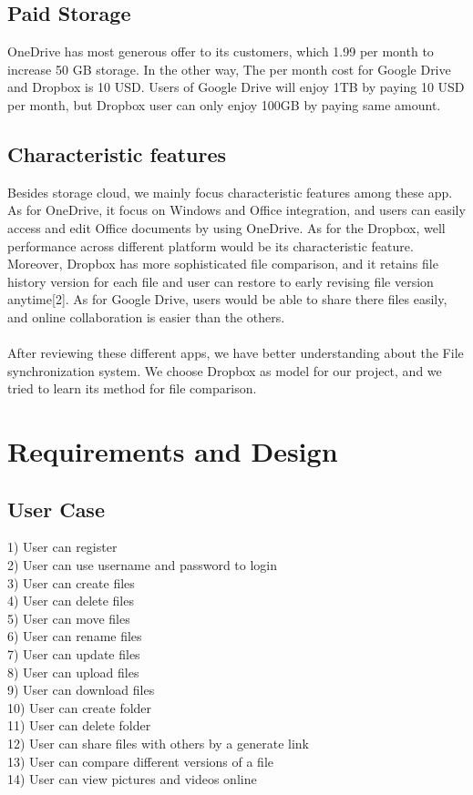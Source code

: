 \documentclass[12pt,a4]{article}
\begin{document}
\subsection{Paid Storage}\label{SubSec-Value}	
OneDrive has most generous offer to its customers, which 1.99 per month to increase 50 GB storage. In the other way, The per month cost for  Google Drive and Dropbox is 10 USD. Users of Google Drive will enjoy 1TB by paying 10 USD per month, but Dropbox user can only enjoy 100GB by paying same amount.

\subsection{Characteristic features}\label{SubSec-Value}	
Besides storage cloud, we mainly focus characteristic features among these app. As for OneDrive, it focus on Windows and Office integration, and users can easily access and edit Office documents by using OneDrive. As for the Dropbox, well performance across different platform would be its characteristic feature. Moreover, Dropbox has more sophisticated file comparison, and it retains file history version for each file and user can restore to early revising file version anytime[2]. As for Google Drive, users would be able to share there files easily, and online collaboration is easier than the others.
\\
\\
After reviewing these different apps, we have better understanding about the File synchronization system. We choose Dropbox as model for our project, and we tried to learn its method for file comparison.


\section{Requirements and Design}\label{Section-Frameworks}
\subsection{User Case}\label{3.1}
1)  User can register\\
2)  User can use username and password to login\\
3)  User can create files\\
4)  User can delete files\\
5)  User can move files\\
6)  User can rename files\\
7)  User can update files\\
8)  User can upload files\\
9)  User can download files\\
10) User can create folder\\
11) User can delete folder\\
12) User can share files with others by a generate link\\
13) User can compare different versions of a file\\
14) User can view pictures and videos online
\end{document}
